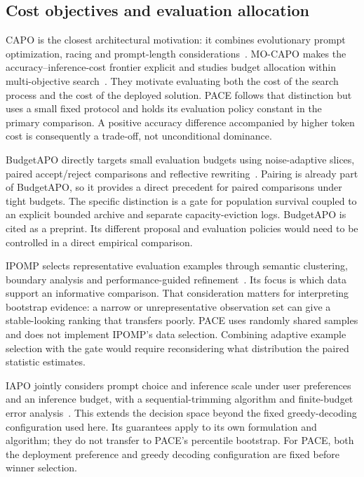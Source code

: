\subsection{Cost objectives and evaluation allocation}
CAPO is the closest architectural motivation: it combines evolutionary prompt
optimization, racing and prompt-length considerations~\cite{capo}. MO-CAPO makes
the accuracy--inference-cost frontier explicit and studies budget allocation
within multi-objective search~\cite{mocapo}. They motivate evaluating both the cost
of the search process and the cost of the deployed solution. PACE follows that
distinction but uses a small fixed protocol and holds its evaluation policy
constant in the primary comparison. A positive accuracy difference accompanied
by higher token cost is consequently a trade-off, not unconditional dominance.

BudgetAPO directly targets small evaluation budgets using noise-adaptive slices,
paired accept/reject comparisons and reflective rewriting~\cite{budgetapo}. Pairing is already part of BudgetAPO, so it provides a direct precedent
for paired comparisons under tight budgets. The
specific distinction is a gate for population survival coupled to an explicit
bounded archive and separate capacity-eviction logs. BudgetAPO is cited as a preprint. Its different proposal and evaluation
policies would need to be controlled in a direct empirical comparison.

IPOMP selects representative evaluation examples through semantic clustering,
boundary analysis and performance-guided refinement~\cite{ipomp}. Its focus is
which data support an informative comparison. That consideration matters for
interpreting bootstrap evidence: a narrow or unrepresentative observation set
can give a stable-looking ranking that transfers poorly. PACE uses randomly
shared samples and does not implement IPOMP's data selection. Combining adaptive
example selection with the gate would require reconsidering what distribution
the paired statistic estimates.

IAPO jointly considers prompt choice and inference scale under user preferences
and an inference budget, with a sequential-trimming algorithm and finite-budget
error analysis~\cite{iapo}. This extends the decision space beyond the fixed
greedy-decoding configuration used here. Its guarantees apply to its own
formulation and algorithm; they do not transfer to PACE's percentile bootstrap.
For PACE, both the deployment preference and greedy decoding configuration
are fixed before winner selection.

